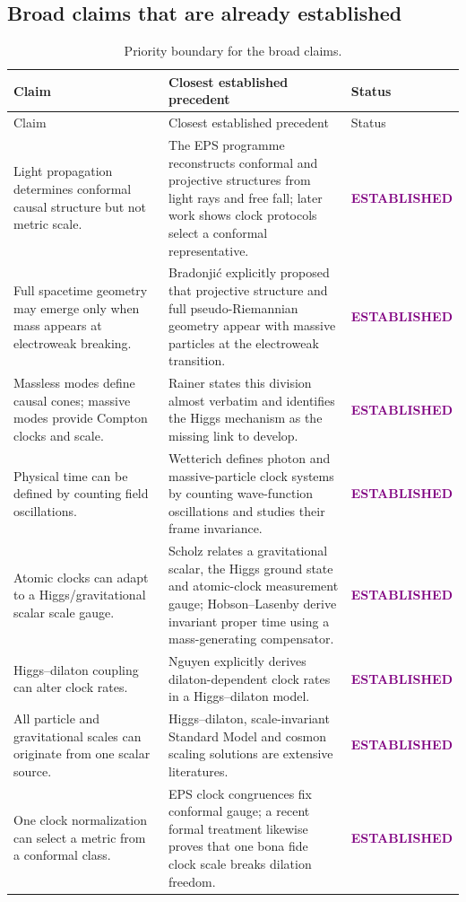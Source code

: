 \documentclass[11pt,a4paper]{article}
\newcommand{\Established}{\textcolor{purple}{\textbf{\tiny ESTABLISHED}}}
\begin{document}
\subsection{Broad claims that are already established}

\small\begin{longtable}{@{}p{}p{}p{}@{}}
\caption{Priority boundary for the broad claims.}\label{tab:priority}\\
\toprule
Claim & Closest established precedent & Status \\
\midrule
\endfirsthead
\toprule
Claim & Closest established precedent & Status \\
\midrule
\endhead
Light propagation determines conformal causal structure but not metric scale. & The EPS programme reconstructs conformal and projective structures from light rays and free fall; later work shows clock protocols select a conformal representative. \cite{EPS,Perlick,Fatibene2015} & \Established \\
Full spacetime geometry may emerge only when mass appears at electroweak breaking. & Bradonji\'c explicitly proposed that projective structure and full pseudo-Riemannian geometry appear with massive particles at the electroweak transition. \cite{Bradonjic2009} & \Established \\
Massless modes define causal cones; massive modes provide Compton clocks and scale. & Rainer states this division almost verbatim and identifies the Higgs mechanism as the missing link to develop. \cite{Rainer2026} & \Established \\
Physical time can be defined by counting field oscillations. & Wetterich defines photon and massive-particle clock systems by counting wave-function oscillations and studies their frame invariance. \cite{WetterichTime2024} & \Established \\
Atomic clocks can adapt to a Higgs/gravitational scalar scale gauge. & Scholz relates a gravitational scalar, the Higgs ground state and atomic-clock measurement gauge; Hobson--Lasenby derive invariant proper time using a mass-generating compensator. \cite{Scholz2014,Hobson2020} & \Established \\
Higgs--dilaton coupling can alter clock rates. & Nguyen explicitly derives dilaton-dependent clock rates in a Higgs--dilaton model. \cite{Nguyen2025} & \Established \\
All particle and gravitational scales can originate from one scalar source. & Higgs--dilaton, scale-invariant Standard Model and cosmon scaling solutions are extensive literatures. \cite{Shaposhnikov2009,Bars2014,WetterichQG2026} & \Established \\
One clock normalization can select a metric from a conformal class. & EPS clock congruences fix conformal gauge; a recent formal treatment likewise proves that one bona fide clock scale breaks dilation freedom. \cite{Fatibene2015,SingleClock2025} & \Established \\
\bottomrule
\end{longtable}
\end{document}
